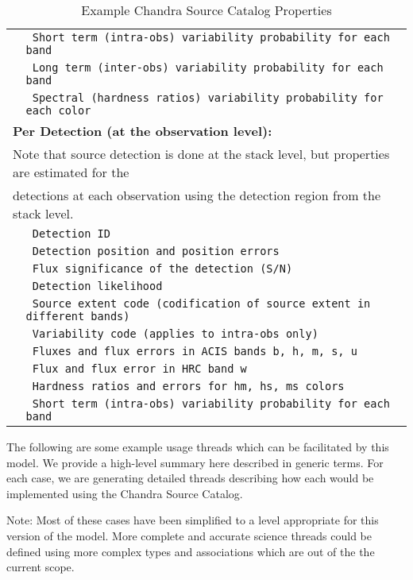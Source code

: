 \begin{table}[ht!]
\begin{tabular}{|p{0.4cm}p{10.0cm}|}
    & \texttt{ Short term (intra-obs) variability probability for each band } \\
    & \texttt{ Long term (inter-obs) variability probability for each band } \\
    & \texttt{ Spectral (hardness ratios) variability probability for each color } \\
    \hline
    \multicolumn{2}{|l|}{\textbf{Per Detection (at the observation level):}} \\
    \multicolumn{2}{|l|}{ Note that source detection is done at the stack level, but properties are estimated for the } \\
    \multicolumn{2}{|l|}{detections at each observation using the detection region from the stack level.} \\
    & \texttt{ Detection ID } \\
    & \texttt{ Detection position and position errors } \\
    & \texttt{ Flux significance of the detection (S/N) } \\
    & \texttt{ Detection likelihood } \\
    & \texttt{ Source extent code (codification of source extent in different bands) } \\
    & \texttt{ Variability code (applies to intra-obs only) } \\
    & \texttt{ Fluxes and flux errors in ACIS bands b, h, m, s, u } \\
    & \texttt{ Flux and flux error in  HRC band w } \\
    & \texttt{ Hardness ratios and errors for hm, hs, ms colors } \\
    & \texttt{ Short term (intra-obs) variability probability for each band } \\
    \hline

  \end{tabular}
  \caption{ Example Chandra Source Catalog Properties }
  \label{tab:chandra_props}

 \end{table}

The following are some example usage threads which can be facilitated by this model.
We provide a high-level summary here described in generic terms.  For each case, we
are generating detailed threads describing how each would be implemented using the
Chandra Source Catalog.

Note: Most of these cases have been simplified to a level appropriate for this version
of the model.  More complete and accurate science threads could be defined using more
complex types and associations which are out of the the current scope.

